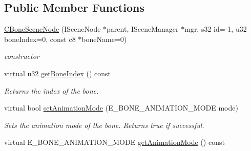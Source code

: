 \subsection*{Public Member Functions}
\begin{DoxyCompactItemize}
\item 
\hypertarget{classirr_1_1scene_1_1_c_bone_scene_node_ae081c34c92966bab947b891453eb263e}{\hyperlink{classirr_1_1scene_1_1_c_bone_scene_node_ae081c34c92966bab947b891453eb263e}{C\-Bone\-Scene\-Node} (I\-Scene\-Node $\ast$parent, I\-Scene\-Manager $\ast$mgr, s32 id=-\/1, u32 bone\-Index=0, const c8 $\ast$bone\-Name=0)}\label{classirr_1_1scene_1_1_c_bone_scene_node_ae081c34c92966bab947b891453eb263e}

\begin{DoxyCompactList}\small\item\em constructor \end{DoxyCompactList}\item 
\hypertarget{classirr_1_1scene_1_1_c_bone_scene_node_a84b0b6b405c28ce80a32e6578368f81a}{virtual u32 \hyperlink{classirr_1_1scene_1_1_c_bone_scene_node_a84b0b6b405c28ce80a32e6578368f81a}{get\-Bone\-Index} () const }\label{classirr_1_1scene_1_1_c_bone_scene_node_a84b0b6b405c28ce80a32e6578368f81a}

\begin{DoxyCompactList}\small\item\em Returns the index of the bone. \end{DoxyCompactList}\item 
\hypertarget{classirr_1_1scene_1_1_c_bone_scene_node_a3f41cf08f51dd6fb67998313f4651177}{virtual bool \hyperlink{classirr_1_1scene_1_1_c_bone_scene_node_a3f41cf08f51dd6fb67998313f4651177}{set\-Animation\-Mode} (E\-\_\-\-B\-O\-N\-E\-\_\-\-A\-N\-I\-M\-A\-T\-I\-O\-N\-\_\-\-M\-O\-D\-E mode)}\label{classirr_1_1scene_1_1_c_bone_scene_node_a3f41cf08f51dd6fb67998313f4651177}

\begin{DoxyCompactList}\small\item\em Sets the animation mode of the bone. Returns true if successful. \end{DoxyCompactList}\item 
\hypertarget{classirr_1_1scene_1_1_c_bone_scene_node_abf6bbe532586363a4db1627f43e2c99b}{virtual E\-\_\-\-B\-O\-N\-E\-\_\-\-A\-N\-I\-M\-A\-T\-I\-O\-N\-\_\-\-M\-O\-D\-E \hyperlink{classirr_1_1scene_1_1_c_bone_scene_node_abf6bbe532586363a4db1627f43e2c99b}{get\-Animation\-Mode} () const }\label{classirr_1_1scene_1_1_c_bone_scene_node_abf6bbe532586363a4db1627f43e2c99b}


\end{DoxyCompactItemize}
